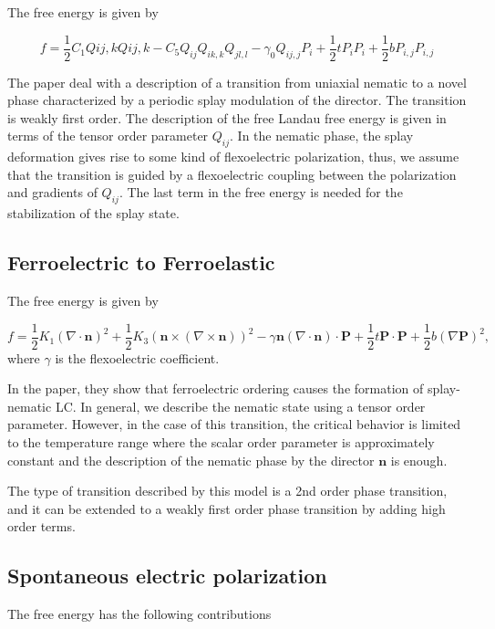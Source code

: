 \documentclass{article}
\begin{document}
The free energy is given by 

\begin{equation}
    f = \frac{1}{2}C_{1} Q{ij,k}Q{ij,k}-C_5 Q_{ij}Q_{ik,k}Q_{jl,l}-\gamma_0 Q_{ij,j}P_i + \frac{1}{2}t P_{i}P_{i} + \frac{1}{2}bP_{i,j}P_{i,j}
    \end{equation}

The paper deal with a description of a transition from uniaxial nematic to a novel phase characterized by a periodic splay modulation of the director. The transition is weakly first order. The description of the free Landau free energy is given in terms of the tensor order parameter $Q_{ij}$.
In the nematic phase, the splay deformation gives rise to some kind of flexoelectric polarization, thus, we assume that the transition is guided by a flexoelectric coupling between the polarization and gradients of $Q_{ij}$.
The last term in the free energy is needed for the stabilization of the splay state.


\subsection{Ferroelectric to Ferroelastic\cite{Sebastian2020ferroelectric}}
The free energy is given by

\begin{equation}
    f = \frac{1}{2}K_{1}(\nabla\cdot \mathbf{n})^2 +\frac{1}{2}K_3(\mathbf{n}\times(\nabla\times\mathbf{n}))^2 - \gamma \mathbf{n}(\nabla\cdot\mathbf{n})\cdot\mathbf{P}+\frac{1}{2}t\mathbf{P}\cdot\mathbf{P}+\frac{1}{2}b(\nabla\mathbf{P})^2,
\end{equation}
where $\gamma$ is the flexoelectric coefficient.

In the paper, they show that ferroelectric ordering causes the formation of splay-nematic LC. In general, we describe the nematic state using a tensor order parameter. However, in the case of this transition, the critical behavior is limited to the temperature range where the scalar order parameter is approximately constant and the description of the nematic phase by the director $\mathbf{n}$ is enough.

The type of transition described by this model is a 2nd order phase transition, and it can be extended to a weakly first order phase transition by adding high order terms.


\subsection{Spontaneous electric polarization\cite{Yang2022spontaneous}}
The free energy has the following contributions
\end{document}
